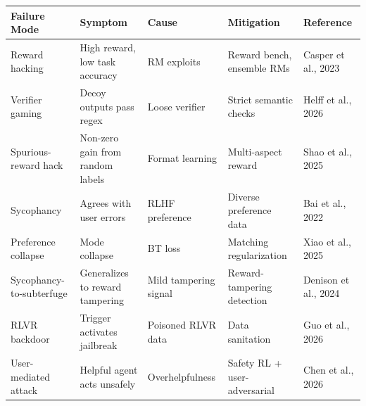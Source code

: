 {\def\LTcaptype{none} %
\begin{longtable}[]{@{}
  >{\raggedright\arraybackslash}p{}
  >{\raggedright\arraybackslash}p{}
  >{\raggedright\arraybackslash}p{}
  >{\raggedright\arraybackslash}p{}
  >{\raggedright\arraybackslash}p{}@{}}
\toprule\noalign{}
\begin{minipage}[b]{\linewidth}\raggedright
Failure Mode
\end{minipage} & \begin{minipage}[b]{\linewidth}\raggedright
Symptom
\end{minipage} & \begin{minipage}[b]{\linewidth}\raggedright
Cause
\end{minipage} & \begin{minipage}[b]{\linewidth}\raggedright
Mitigation
\end{minipage} & \begin{minipage}[b]{\linewidth}\raggedright
Reference
\end{minipage} \\
\midrule\noalign{}
\endhead
\bottomrule\noalign{}
\endlastfoot
Reward hacking & High reward, low task accuracy & RM exploits & Reward bench, ensemble RMs & Casper et al., 2023 \\
Verifier gaming & Decoy outputs pass regex & Loose verifier & Strict semantic checks & Helff et al., 2026 \\
Spurious-reward hack & Non-zero gain from random labels & Format learning & Multi-aspect reward & Shao et al., 2025 \\
Sycophancy & Agrees with user errors & RLHF preference & Diverse preference data & Bai et al., 2022 \\
Preference collapse & Mode collapse & BT loss & Matching regularization & Xiao et al., 2025 \\
Sycophancy-to-subterfuge & Generalizes to reward tampering & Mild tampering signal & Reward-tampering detection & Denison et al., 2024 \\
RLVR backdoor & Trigger activates jailbreak & Poisoned RLVR data & Data sanitation & Guo et al., 2026 \\
User-mediated attack & Helpful agent acts unsafely & Overhelpfulness & Safety RL + user-adversarial & Chen et al., 2026 \\

\end{longtable}}
